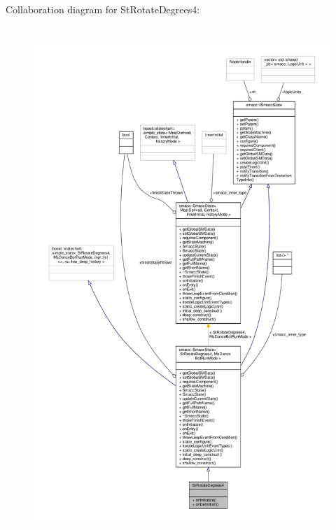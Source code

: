 Collaboration diagram for St\+Rotate\+Degrees4\+:
\nopagebreak
\begin{figure}[H]
\begin{center}
\leavevmode
\includegraphics[height=550pt]{structStRotateDegrees4__coll__graph}
\end{center}
\end{figure}
